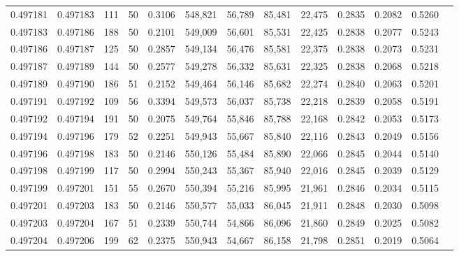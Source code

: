 \begin{tabular}{rrrrrrrrrrrrr}
0.497181 & 0.497183 &   111 &  50 &                                     0.3106 & 548,821 &  56,789 &  85,481 &  22,475 & 0.2835 & 0.2082 & 0.5260 \\
0.497183 & 0.497186 &   188 &  50 &                                     0.2101 & 549,009 &  56,601 &  85,531 &  22,425 & 0.2838 & 0.2077 & 0.5243 \\
0.497186 & 0.497187 &   125 &  50 &                                     0.2857 & 549,134 &  56,476 &  85,581 &  22,375 & 0.2838 & 0.2073 & 0.5231 \\
0.497187 & 0.497189 &   144 &  50 &                                     0.2577 & 549,278 &  56,332 &  85,631 &  22,325 & 0.2838 & 0.2068 & 0.5218 \\
0.497189 & 0.497190 &   186 &  51 &                                     0.2152 & 549,464 &  56,146 &  85,682 &  22,274 & 0.2840 & 0.2063 & 0.5201 \\
0.497191 & 0.497192 &   109 &  56 &                                     0.3394 & 549,573 &  56,037 &  85,738 &  22,218 & 0.2839 & 0.2058 & 0.5191 \\
0.497192 & 0.497194 &   191 &  50 &                                     0.2075 & 549,764 &  55,846 &  85,788 &  22,168 & 0.2842 & 0.2053 & 0.5173 \\
0.497194 & 0.497196 &   179 &  52 &                                     0.2251 & 549,943 &  55,667 &  85,840 &  22,116 & 0.2843 & 0.2049 & 0.5156 \\
0.497196 & 0.497198 &   183 &  50 &                                     0.2146 & 550,126 &  55,484 &  85,890 &  22,066 & 0.2845 & 0.2044 & 0.5140 \\
0.497198 & 0.497199 &   117 &  50 &                                     0.2994 & 550,243 &  55,367 &  85,940 &  22,016 & 0.2845 & 0.2039 & 0.5129 \\
0.497199 & 0.497201 &   151 &  55 &                                     0.2670 & 550,394 &  55,216 &  85,995 &  21,961 & 0.2846 & 0.2034 & 0.5115 \\
0.497201 & 0.497203 &   183 &  50 &                                     0.2146 & 550,577 &  55,033 &  86,045 &  21,911 & 0.2848 & 0.2030 & 0.5098 \\
0.497203 & 0.497204 &   167 &  51 &                                     0.2339 & 550,744 &  54,866 &  86,096 &  21,860 & 0.2849 & 0.2025 & 0.5082 \\
0.497204 & 0.497206 &   199 &  62 &                                     0.2375 & 550,943 &  54,667 &  86,158 &  21,798 & 0.2851 & 0.2019 & 0.5064 \\

\end{tabular}

